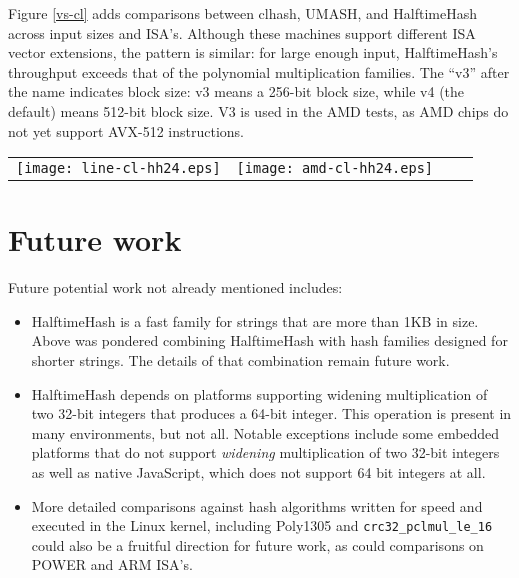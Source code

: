 \documentclass[runningheads]{llncs}
\begin{document}
Figure \ref{vs-cl} adds comparisons between clhash, UMASH, and HalftimeHash across input sizes and ISA's.
Although these machines support different ISA vector extensions, the pattern is similar: for large enough input, HalftimeHash's throughput exceeds that of the polynomial multiplication families.
The ``v3'' after the name indicates block size: v3 means a 256-bit block size, while v4 (the default) means 512-bit block size.
V3 is used in the AMD tests, as AMD chips do not yet support AVX-512 instructions.


\begin{figure*}
\begin{tabular}{cccc}
\texttt{[image: line-cl-hh24.eps]}
&
\texttt{[image: amd-cl-hh24.eps]}
\end{tabular}
\caption{
  \label{vs-cl}
  Comparison of Intel (i7-7800x) and AMD (EC2 c5a.large, 7R32 chip) performance.
  These AMD chips do not support AVX-512, but still HalftimeHash with 256-bit blocks exceeds the speed of clmul-based hashing methods by up to a factor of 2 on long strings.
  In both cases, for long strings, HalftimeHash with 24 bytes of output is faster than clhash and UMASH.
  HalftimeHash24 also has lower collision probability.
}
\end{figure*}

\section{Future work}

Future potential work not already mentioned includes:

\begin{itemize}
\item HalftimeHash is a fast family for strings that are more than 1KB in size.
  Above was pondered combining HalftimeHash with hash families designed for shorter strings.
  The details of that combination remain future work.
\item HalftimeHash depends on platforms supporting widening multiplication of two 32-bit integers that produces a 64-bit integer.
  This operation is present in many environments, but not all.
  Notable exceptions include some embedded platforms that do not support {\em widening} multiplication of two 32-bit integers as well as native JavaScript, which does not support 64 bit integers at all.
\item More detailed comparisons against hash algorithms written for speed and executed in the Linux kernel, including Poly1305 and \texttt{crc32\_pclmul\_le\_16} could also be a fruitful direction for future work, as could comparisons on POWER and ARM ISA's.
\end{itemize}
\end{document}
